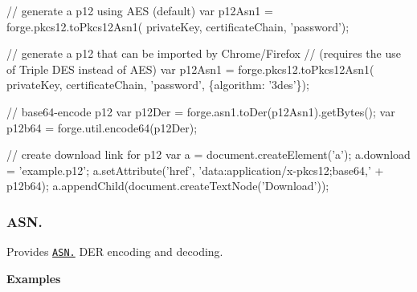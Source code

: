 \begin{DoxyCode}
// generate a p12 using AES (default)
var p12Asn1 = forge.pkcs12.toPkcs12Asn1(
  privateKey, certificateChain, 'password');

// generate a p12 that can be imported by Chrome/Firefox
// (requires the use of Triple DES instead of AES)
var p12Asn1 = forge.pkcs12.toPkcs12Asn1(
  privateKey, certificateChain, 'password',
  \{algorithm: '3des'\});

// base64-encode p12
var p12Der = forge.asn1.toDer(p12Asn1).getBytes();
var p12b64 = forge.util.encode64(p12Der);

// create download link for p12
var a = document.createElement('a');
a.download = 'example.p12';
a.setAttribute('href', 'data:application/x-pkcs12;base64,' + p12b64);
a.appendChild(document.createTextNode('Download'));
\end{DoxyCode}


\label{_asn}%
 \subsubsection*{A\+S\+N.}

Provides \href{http://en.wikipedia.org/wiki/ASN.1}{\tt A\+S\+N.} D\+ER encoding and decoding.

{\bfseries Examples}


